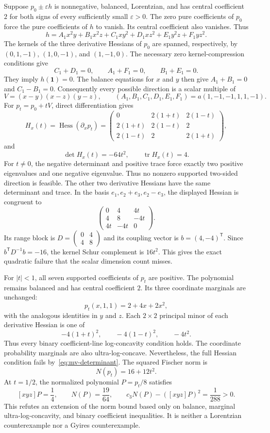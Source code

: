 \documentclass[11pt,a4paper]{article}
\theoremstyle{definition}
\theoremstyle{remark}
\newcommand{\T}{\mathsf{T}}
\begin{document}
Suppose $p_0\pm\varepsilon h$ is nonnegative, balanced, Lorentzian, and has central coefficient $2$ for both signs of every sufficiently small $\varepsilon>0$.
The zero pure coefficients of $p_0$ force the pure coefficients of $h$ to vanish.
Its central coefficient also vanishes. Thus
\[
 h=A_1x^2y+B_1x^2z+C_1xy^2+D_1xz^2+E_1y^2z+F_1yz^2.
\]
The kernels of the three derivative Hessians of $p_0$ are spanned, respectively, by
$(0,1,-1)$, $(1,0,-1)$, and $(1,-1,0)$.
The necessary zero kernel-compression conditions give
\[
 C_1+D_1=0,\qquad A_1+F_1=0,\qquad B_1+E_1=0.
\]
They imply $h(\mathbf1)=0$.
The balance equations for $x$ and $y$ then give
$A_1+B_1=0$ and $C_1-B_1=0$.
Consequently every possible direction is a scalar multiple of
\[
 V=(x-y)(x-z)(y-z),\qquad
 (A_1,B_1,C_1,D_1,E_1,F_1)=a(1,-1,-1,1,1,-1).
\]
For $p_t=p_0+tV$, direct differentiation gives
\[
 H_x(t)=\operatorname{Hess}(\partial_xp_t)
 =\begin{pmatrix}
 0&2(1+t)&2(1-t)\\
 2(1+t)&2(1-t)&2\\
 2(1-t)&2&2(1+t)
 \end{pmatrix},
\]
and
\begin{equation}\label{eq:mv-determinant}
 \det H_x(t)=-64t^2,\qquad \operatorname{tr}H_x(t)=4.
\end{equation}
For $t\ne0$, the negative determinant and positive trace force exactly two positive eigenvalues and one negative eigenvalue.
Thus no nonzero supported two-sided direction is feasible.
The other two derivative Hessians have the same determinant and trace.
In the basis $e_1,e_2+e_3,e_2-e_3$, the displayed Hessian is congruent to
\[
 \begin{pmatrix}0&4&4t\\4&8&-4t\\4t&-4t&0\end{pmatrix}.
\]
Its range block is $D=\left(\begin{smallmatrix}0&4\\4&8\end{smallmatrix}\right)$ and its coupling vector is $b=(4,-4)^\T$.
Since $b^\T D^{-1}b=-16$, the kernel Schur complement is $16t^2$.
This gives the exact quadratic failure that the scalar dimension count misses.

For $|t|<1$, all seven supported coefficients of $p_t$ are positive.
The polynomial remains balanced and has central coefficient $2$.
Its three coordinate marginals are unchanged:
\[
 p_t(x,1,1)=2+4x+2x^2,
\]
with the analogous identities in $y$ and $z$.
Each $2\times2$ principal minor of each derivative Hessian is one of
\[
 -4(1+t)^2,\qquad -4(1-t)^2,\qquad -4t^2.
\]
Thus every binary coefficient-line log-concavity condition holds.
The coordinate probability marginals are also ultra-log-concave.
Nevertheless, the full Hessian condition fails by~\eqref{eq:mv-determinant}.
The squared Fischer norm is
\[
 N(p_t)=16+12t^2.
\]
At $t=1/2$, the normalized polynomial $P=p_t/8$ satisfies
\[
 [xyz]P=\frac14,\qquad N(P)=\frac{19}{64},\qquad
 c_3N(P)-([xyz]P)^2=\frac1{288}>0.
\]
This refutes an extension of the norm bound based only on balance, marginal ultra-log-concavity, and binary coefficient inequalities.
It is neither a Lorentzian counterexample nor a Gyires counterexample.
\end{document}
